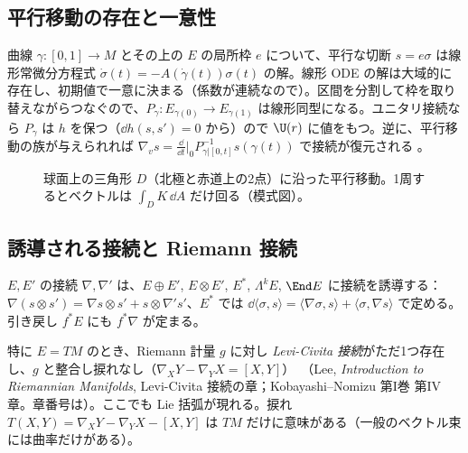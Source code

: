 \subsection{平行移動の存在と一意性}
曲線 $\gamma:[0,1]\to M$ とその上の $E$ の局所枠 $e$ について、平行な切断 $s=e\sigma$ は線形常微分方程式 $\dot\sigma(t)=-A(\dot\gamma(t))\sigma(t)$ の解。線形 ODE の解は大域的に存在し、初期値で一意に決まる（係数が連続なので）。区間を分割して枠を取り替えながらつなぐので、$P_\gamma:E_{\gamma(0)}\to E_{\gamma(1)}$ は線形同型になる。ユニタリ接続なら $P_\gamma$ は $h$ を保つ（$\dd h(s,s')=0$ から）ので $\U(r)$ に値をもつ。逆に、平行移動の族が与えられれば $\nabla_{v}s=\frac{\dd}{\dd t}\big|_0P_{\gamma|[0,t]}^{-1}s(\gamma(t))$ で接続が復元される \tC。

\begin{figure}[h]
\centering
{}
\caption{球面上の三角形 $D$（北極と赤道上の2点）に沿った平行移動。1周するとベクトルは $\int_DK\,\dd A$ だけ回る（模式図）。}
\end{figure}

\subsection{誘導される接続と Riemann 接続}
$E,E'$ の接続 $\nabla,\nabla'$ は、$E\oplus E'$, $E\otimes E'$, $E^*$, $\Lambda^kE$, $\End E$ に接続を誘導する：$\nabla(s\otimes s')=\nabla s\otimes s'+s\otimes\nabla's'$、$E^*$ では $\dd\langle\sigma,s\rangle=\langle\nabla\sigma,s\rangle+\langle\sigma,\nabla s\rangle$ で定める。引き戻し $f^*E$ にも $f^*\nabla$ が定まる。

特に $E=TM$ のとき、Riemann 計量 $g$ に対し \emph{Levi-Civita 接続}がただ1つ存在し、$g$ と整合し捩れなし（$\nabla_XY-\nabla_YX=[X,Y]$）\tC\ （Lee, \emph{Introduction to Riemannian Manifolds}, Levi-Civita 接続の章；Kobayashi--Nomizu 第I巻 第IV章。章番号は\tQ）。ここでも Lie 括弧が現れる。捩れ $T(X,Y)=\nabla_XY-\nabla_YX-[X,Y]$ は $TM$ だけに意味がある（一般のベクトル束には曲率だけがある）。


